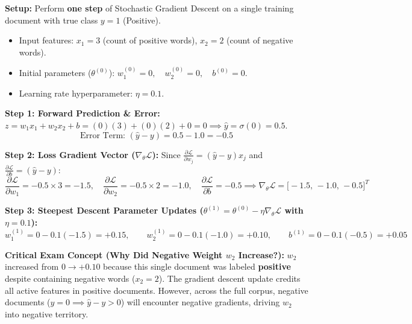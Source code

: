 \documentclass[10pt,a4paper]{article}
\begin{document}
\begin{examplebox}
\par\vspace{1pt}
\textbf{Setup:} Perform \textbf{one step} of Stochastic Gradient Descent on a single training document with true class $y = 1$ (Positive).
\begin{itemize}[leftmargin=12pt, itemsep=0.5pt, parsep=0pt]
    \item Input features: $x_1 = 3$ (count of positive words), $x_2 = 2$ (count of negative words).
    \item Initial parameters ($\theta^{(0)}$): $w_1^{(0)} = 0, \quad w_2^{(0)} = 0, \quad b^{(0)} = 0$.
    \item Learning rate hyperparameter: $\eta = 0.1$.
\end{itemize}

\noindent\textbf{Step 1: Forward Prediction \& Error:}
$z = w_1 x_1 + w_2 x_2 + b = (0)(3) + (0)(2) + 0 = 0 \implies \hat{y} = \sigma(0) = \mathbf{0.5}$.
$$\text{Error Term: } (\hat{y} - y) = 0.5 - 1.0 = \mathbf{-0.5}$$

\noindent\textbf{Step 2: Loss Gradient Vector ($\nabla_\theta \mathcal{L}$):} Since $\frac{\partial \mathcal{L}}{\partial w_j} = (\hat{y} - y) x_j$ and $\frac{\partial \mathcal{L}}{\partial b} = (\hat{y} - y)$:
\[
\frac{\partial \mathcal{L}}{\partial w_1} = -0.5 \times 3 = \mathbf{-1.5}, \quad \frac{\partial \mathcal{L}}{\partial w_2} = -0.5 \times 2 = \mathbf{-1.0}, \quad \frac{\partial \mathcal{L}}{\partial b} = \mathbf{-0.5} \implies \nabla_\theta \mathcal{L} = \big[ -1.5,\, -1.0,\, -0.5 \big]^T
\]

\noindent\textbf{Step 3: Steepest Descent Parameter Updates ($\theta^{(1)} = \theta^{(0)} - \eta \nabla_\theta \mathcal{L}$ with $\eta = 0.1$):}
\[
w_1^{(1)} = 0 - 0.1(-1.5) = \mathbf{+0.15}, \qquad w_2^{(1)} = 0 - 0.1(-1.0) = \mathbf{+0.10}, \qquad b^{(1)} = 0 - 0.1(-0.5) = \mathbf{+0.05}
\]

\noindent\textbf{Critical Exam Concept (Why Did Negative Weight $w_2$ Increase?):}
$w_2$ increased from $0 \to +0.10$ because this single document was labeled \textbf{positive} despite containing negative words ($x_2 = 2$). The gradient descent update credits all active features in positive documents. However, across the full corpus, negative documents ($y=0 \implies \hat{y}-y > 0$) will encounter negative gradients, driving $w_2$ into negative territory.
\end{examplebox}
\vspace{2pt}
\end{document}
